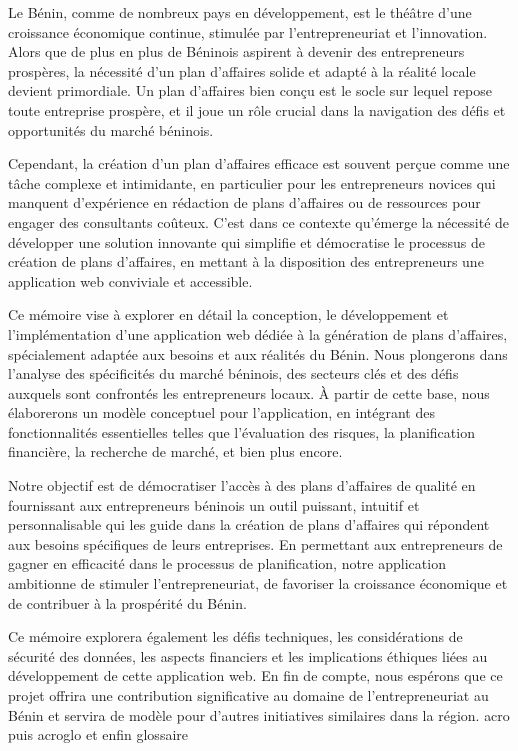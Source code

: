 \introduction
Le Bénin, comme de nombreux pays en développement, est le théâtre d'une croissance économique continue, stimulée par l'entrepreneuriat et l'innovation. Alors que de plus en plus de Béninois aspirent à devenir des entrepreneurs prospères, la nécessité d'un plan d'affaires solide et adapté à la réalité locale devient primordiale. Un plan d'affaires bien conçu est le socle sur lequel repose toute entreprise prospère, et il joue un rôle crucial dans la navigation des défis et opportunités du marché béninois.

Cependant, la création d'un plan d'affaires efficace est souvent perçue comme une tâche complexe et intimidante, en particulier pour les entrepreneurs novices qui manquent d'expérience en rédaction de plans d'affaires ou de ressources pour engager des consultants coûteux. C'est dans ce contexte qu'émerge la nécessité de développer une solution innovante qui simplifie et démocratise le processus de création de plans d'affaires, en mettant à la disposition des entrepreneurs une application web conviviale et accessible.

Ce mémoire vise à explorer en détail la conception, le développement et l'implémentation d'une application web dédiée à la génération de plans d'affaires, spécialement adaptée aux besoins et aux réalités du Bénin. Nous plongerons dans l'analyse des spécificités du marché béninois, des secteurs clés et des défis auxquels sont confrontés les entrepreneurs locaux. À partir de cette base, nous élaborerons un modèle conceptuel pour l'application, en intégrant des fonctionnalités essentielles telles que l'évaluation des risques, la planification financière, la recherche de marché, et bien plus encore.

Notre objectif est de démocratiser l'accès à des plans d'affaires de qualité en fournissant aux entrepreneurs béninois un outil puissant, intuitif et personnalisable qui les guide dans la création de plans d'affaires qui répondent aux besoins spécifiques de leurs entreprises. En permettant aux entrepreneurs de gagner en efficacité dans le processus de planification, notre application ambitionne de stimuler l'entrepreneuriat, de favoriser la croissance économique et de contribuer à la prospérité du Bénin.

Ce mémoire explorera également les défis techniques, les considérations de sécurité des données, les aspects financiers et les implications éthiques liées au développement de cette application web. En fin de compte, nous espérons que ce projet offrira une contribution significative au domaine de l'entrepreneuriat au Bénin et servira de modèle pour d'autres initiatives similaires dans la région.  \gls{acro} puis \Gls{acroglo} et enfin \gls{glossaire}